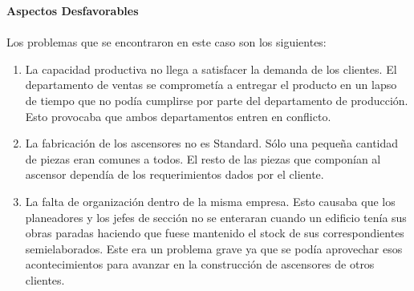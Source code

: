 \documentclass[a4paper,10pt,titlepage]{article}
\begin{document}
	\textbf{Aspectos Desfavorables}\\\\
		\indent Los problemas que se encontraron en este caso son los siguientes:
		\begin{enumerate}
		  \item La capacidad productiva no llega a satisfacer la demanda de los clientes. El departamento de ventas se compromet\'ia a entregar el 
		  producto en un lapso de tiempo que no pod\'ia cumplirse por parte del departamento de producci\'on. Esto provocaba que ambos departamentos
		  entren en conflicto.
		  \item La fabricaci\'on de los ascensores no es Standard. S\'olo una peque\~na cantidad de piezas eran comunes a todos. El resto de las piezas 
		  que compon\'ian al ascensor depend\'ia de los requerimientos dados por el cliente.
		  \item La falta de organizaci\'on dentro de la misma empresa. Esto causaba que los planeadores y los jefes de secci\'on no se enteraran cuando 
		  un edificio ten\'ia sus obras paradas haciendo que fuese mantenido el stock de sus correspondientes semielaborados. Este era un problema grave 
		  ya que se pod\'ia aprovechar esos acontecimientos para avanzar en la construcci\'on de ascensores de otros clientes.\\
		\end{enumerate}
\end{document}
